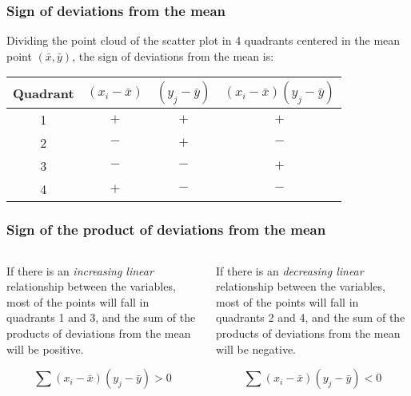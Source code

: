 \begin{frame}
\frametitle{Sign of deviations from the mean}
Dividing the point cloud of the scatter plot in 4 quadrants centered in the mean point $(\bar x, \bar y)$, the sign of
deviations from the mean is:
\begin{center}
\begin{tabular}{cccc}
Quadrant & $(x_i-\bar x)$ & $(y_j-\bar y)$ & $(x_i-\bar x)(y_j-\bar y)$\\
\hline
1 & $+$ & $+$ & \alert{$+$}\\
2 & $-$ & $+$ & \alert{$-$}\\
3 & $-$ & $-$ & \alert{$+$}\\
4 & $+$ & $-$ & \alert{$-$}\\
\hline
\end{tabular}

\resizebox{0.4\textwidth}{!}{}
\end{center}
\end{frame}


\begin{frame}
\frametitle{Sign of the product of deviations from the mean}
\begin{columns}[t]
\begin{column}{0.5\textwidth}
If there is an \emph{increasing linear} relationship between the variables, most of the points will fall in quadrants 1 and 3, and the sum of the products of deviations from the mean will be positive.

\centering
{}

\[\sum(x_i-\bar x)(y_j-\bar y) >0\]
\end{column}

\begin{column}{0.5\textwidth}
If there is an \emph{decreasing linear} relationship between the variables, most of the points will fall in quadrants 2
and 4, and the sum of the products of deviations from the mean will be negative.

\centering
{}

\[\sum(x_i-\bar x)(y_j-\bar y) <0\]
\end{column}
\end{columns}
\end{frame}


